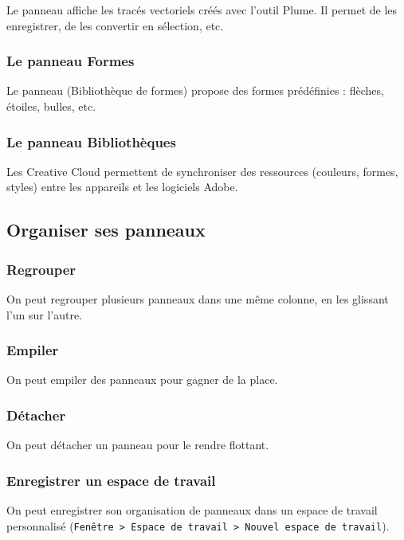 Le panneau  affiche les tracés vectoriels créés avec l'outil Plume. Il permet de les enregistrer, de les convertir en sélection, etc.

\subsubsection{Le panneau Formes}

Le panneau  (Bibliothèque de formes) propose des formes prédéfinies : flèches, étoiles, bulles, etc.

\subsubsection{Le panneau Bibliothèques}

Les  Creative Cloud permettent de synchroniser des ressources (couleurs, formes, styles) entre les appareils et les logiciels Adobe.

\subsection{Organiser ses panneaux}

\subsubsection{Regrouper}

On peut regrouper plusieurs panneaux dans une même colonne, en les glissant l'un sur l'autre.

\subsubsection{Empiler}

On peut empiler des panneaux pour gagner de la place.

\subsubsection{Détacher}

On peut détacher un panneau pour le rendre flottant.

\subsubsection{Enregistrer un espace de travail}

On peut enregistrer son organisation de panneaux dans un espace de travail personnalisé (\texttt{Fenêtre > Espace de travail > Nouvel espace de travail}).

